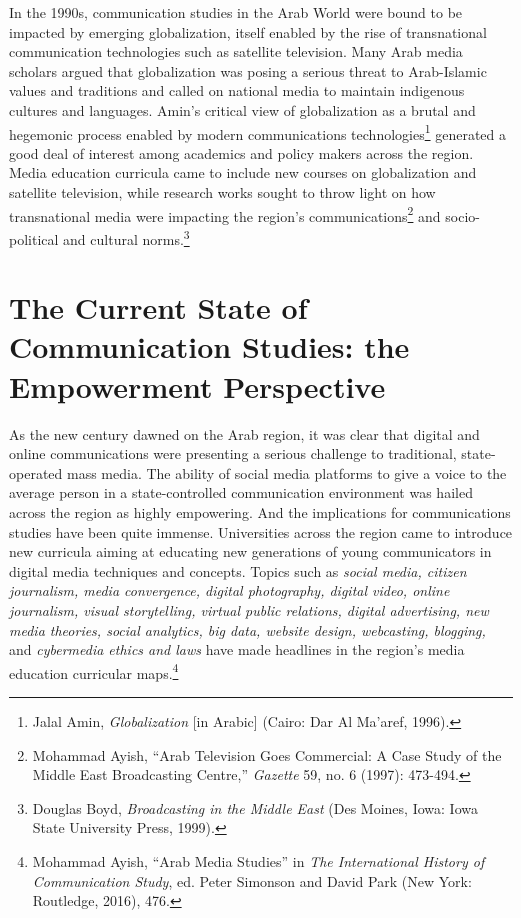 \documentclass{tufte-handout}
\begin{document}
In the 1990s, communication studies in the Arab World were bound to be
impacted by emerging globalization, itself enabled by the rise of
transnational communication technologies such as satellite television.
Many Arab media scholars argued that globalization was posing a serious
threat to Arab-Islamic values and traditions and called on national
media to maintain indigenous cultures and languages. Amin's critical
view of globalization as a brutal and hegemonic process enabled by
modern communications technologies\footnote{Jalal Amin, \emph{Globalization} {[}in Arabic{]} (Cairo: Dar Al
  Ma'aref, 1996).
}
generated a good deal of interest among academics and policy makers
across the region. Media education curricula came to include new courses
on globalization and satellite television, while research works sought
to throw light on how transnational media were impacting the region's
communications\footnote{Mohammad Ayish, ``Arab Television Goes Commercial: A Case Study of the
  Middle East Broadcasting Centre,'' \emph{Gazette} 59, no. 6 (1997):
  473-494.
} and socio-political
and cultural norms.\footnote{Douglas Boyd, \emph{Broadcasting in the Middle East} (Des Moines,
  Iowa: Iowa State University Press, 1999).
}

\hypertarget{the-current-state-of-communication-studies-the-empowerment-perspective}{%
\section{The Current State of Communication Studies: the Empowerment
Perspective}\label{the-current-state-of-communication-studies-the-empowerment-perspective}}

As the new century dawned on the Arab region, it was clear that digital
and online communications were presenting a serious challenge to
traditional, state-operated mass media. The ability of social media
platforms to give a voice to the average person in a state-controlled
communication environment was hailed across the region as highly
empowering. And the implications for communications studies have been
quite immense. Universities across the region came to introduce new
curricula aiming at educating new generations of young communicators in
digital media techniques and concepts. Topics such as \emph{social
media, citizen journalism, media convergence, digital photography,
digital video, online journalism, visual storytelling, virtual public
relations, digital advertising, new media theories, social analytics,
big data, website design, webcasting, blogging,} and \emph{cybermedia
ethics and laws} have made headlines in the region's media education
curricular maps.\footnote{Mohammad Ayish, ``Arab Media Studies'' in \emph{The International
  History of Communication Study}, ed. Peter Simonson and David Park
  (New York: Routledge, 2016), 476.
}
\end{document}
